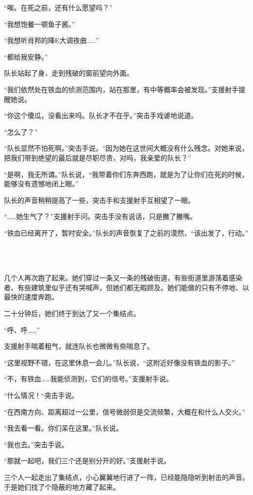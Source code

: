 “唉。在死之前，还有什么愿望吗？”

“我想饱餐一顿鱼子酱。”

“我想听肖邦的降E大调夜曲……”

“都给我安静。”

队长站起了身，走到残破的窗前望向外面。

“我们依然处在铁血的侦测范围内，站在那里，有中等概率会被发现。”支援射手提醒她说。

“你这个傻瓜，没看出来吗。队长才不在乎。”突击手戏谑地说道。

“怎么了？”

“队长显然不怕死啊。”突击手说，“因为她在这世间大概没有什么残念。对她来说，把我们带到绝望的最后就是尽职尽责，对吗，我亲爱的队长？”

“是啊，我无所谓。”队长说，“我带着你们东奔西跑，就是为了让你们在死的时候，能够没有遗憾地闭上眼。”

队长的声音稍稍提高了一些，突击手和支援射手互相望了一眼。

“……她生气了？”支援射手问。突击手没有说话，只是撇了撇嘴。

“铁血已经离开了，暂时安全。”队长的声音恢复了之前的漠然，“该出发了，行动。”

 \section*{}

几个人再次跑了起来。她们穿过一条又一条的残破街道，有些街道里游荡着感染者、有些建筑里似乎还有哭喊声，但她们都无暇顾及。她们能做的只有不停地、以最快的速度奔跑。

二十分钟后，她们终于到达了又一个集结点。

“呼、呼……”

支援射手喘着粗气，就连队长也微微有些喘息了。

“这里视野不错，在这里休息一会儿。”队长说，“这附近好像没有铁血的影子。”

“不，有铁血……我能侦测到，它们的信号。”支援射手说。

“什么情况！“突击手说。

“在西南方向、距离超过一公里，信号微弱但是交流频繁，大概在和什么人交火。”

“我去看一看。你们呆在这里。”队长说。

“我也去。”突击手说。

“那就一起吧，我们三个还是别分开的好。”支援射手说。

三个人一起走出了集结点，小心翼翼地行进了一阵，已经能隐隐听到射击的声音。于是她们找了个隐蔽的地方藏了起来。

